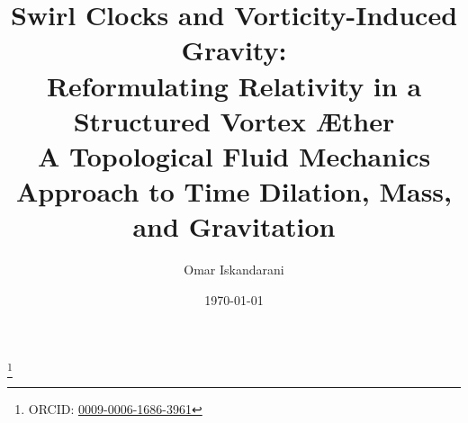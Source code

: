 \documentclass[a4paper, aps,preprint,superscriptaddress, 12pt]{revtex4}
\begin{document}
\author{Omar Iskandarani}
\title{
    Swirl Clocks and Vorticity-Induced Gravity:\\
    Reformulating Relativity in a Structured Vortex Æther\\
    \textnormal{\normalsize A Topological Fluid Mechanics Approach to Time Dilation, Mass, and Gravitation}
}

\date{\today}
\thanks{ORCID: \href{https://orcid.org/0009-0006-1686-3961}{0009-0006-1686-3961}}














\appendix \label{sec:Part-6}
\label{appendix:1}
\label{appendix:2}
\end{document}
